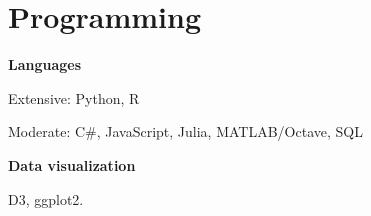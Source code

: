 \documentclass[letterpaper]{resume}
\begin{document}
\section{Programming}
\vspace{1pt}
\begin{compactitem}
\item \textbf{Languages} 
\begin{compactitem}
\item Extensive: Python, R
\item Moderate: C\#, JavaScript, Julia, MATLAB/Octave, SQL
\end{compactitem}
\item \textbf{Data visualization}
\begin{compactitem}
\item D3, ggplot2.
\end{compactitem}
\end{compactitem}
\end{document}
